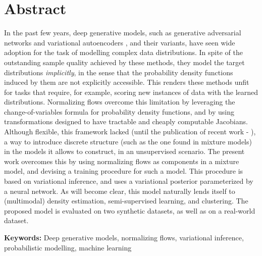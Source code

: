 \section*{Abstract}


In the past few years, deep generative models, such as generative adversarial networks
\autocite{GAN} and variational autoencoders \autocite{vaepaper}, and their variants,
have seen wide adoption for the task of modelling complex data distributions.
In spite of the outstanding sample quality achieved by these methods,
they model the target distributions \emph{implicitly}, in the sense that the probability
density functions induced by them are not explicitly accessible. This renders these methods unfit for
tasks that require, for example, scoring new instances of data with the learned
distributions. Normalizing flows overcome this limitation by leveraging the
change-of-variables formula for probability density functions, and by using
transformations designed to have tractable and cheaply computable Jacobians. Although
flexible, this framework lacked (until the publication of recent work -
\autocites{semisuplearning_nflows, RAD}), a way to introduce discrete
structure (such as the one found in mixture models) in the models it allows to
construct, in an unsupervised scenario. The present work overcomes this by using normalizing flows as components in a mixture model,
and devising a training procedure for such a model.
This procedure is based on variational inference, and uses a variational posterior
parameterized by a neural network. As will become clear, this model naturally
lends itself to (multimodal) density estimation, semi-supervised learning, and
clustering. The proposed model is evaluated on two synthetic datasets, as well
as on a real-world dataset.
\vfill

\textbf{\Large Keywords:} Deep generative models, normalizing flows, variational
inference, probabilistic modelling, machine learning
